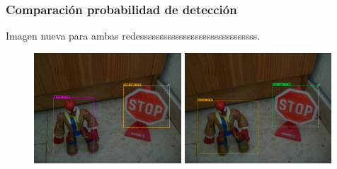 \documentclass{beamer}
\begin{document}
\begin{frame}
	\frametitle{Comparación probabilidad de detección}
	\begin{outline}
		\1 Imagen nueva para ambas redessssssssssssssssssssssssssssss.
	\end{outline}
	\begin{figure}
		\centering
		\includegraphics[width=5.5cm]{figs/predictionsoriginal}\hspace{0.1cm}
		\includegraphics[width=5.5cm]{figs/predictionscustom}
	\end{figure}
\end{frame}
\end{document}
